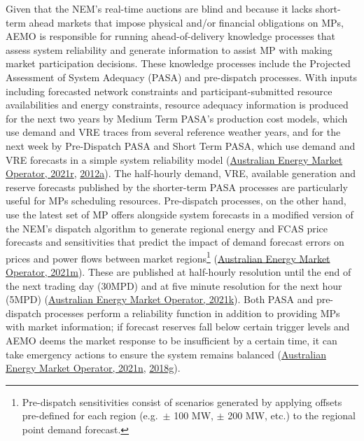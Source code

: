 \documentclass[12pt,a4paper,]{report}
\begin{document}
Given that the NEM's real-time auctions are blind and because it lacks
short-term ahead markets that impose physical and/or financial
obligations on MPs, AEMO is responsible for running ahead-of-delivery
knowledge processes that assess system reliability and generate
information to assist MP with making market participation decisions.
These knowledge processes include the Projected Assessment of System
Adequacy (PASA) and pre-dispatch processes. With inputs including
forecasted network constraints and participant-submitted resource
availabilities and energy constraints, resource adequacy information is
produced for the next two years by Medium Term PASA's production cost
models, which use demand and VRE traces from several reference weather
years, and for the next week by Pre-Dispatch PASA and Short Term PASA,
which use demand and VRE forecasts in a simple system reliability model
(\protect\hyperlink{ref-australianenergymarketoperatorMediumTermPASA2021}{Australian
Energy Market Operator, 2021r},
\protect\hyperlink{ref-australianenergymarketoperatorShortTermPASA2012}{2012a}).
The half-hourly demand, VRE, available generation and reserve forecasts
published by the shorter-term PASA processes are particularly useful for
MPs scheduling resources. Pre-dispatch processes, on the other hand, use
the latest set of MP offers alongside system forecasts in a modified
version of the NEM's dispatch algorithm to generate regional energy and
FCAS price forecasts and sensitivities that predict the impact of demand
forecast errors on prices and power flows between market
regions\footnote{Pre-dispatch sensitivities consist of scenarios
  generated by applying offsets pre-defined for each region
  (e.g.~\(\pm\) 100 MW, \(\pm\) 200 MW, etc.) to the regional point
  demand forecast.}
(\protect\hyperlink{ref-australianenergymarketoperatorPreDispatchSensitivities2021}{Australian
Energy Market Operator, 2021m}). These are published at half-hourly
resolution until the end of the next trading day (30MPD) and at five
minute resolution for the next hour (5MPD)
(\protect\hyperlink{ref-australianenergymarketoperatorPredispatchOperatingProcedure2021}{Australian
Energy Market Operator, 2021k}). Both PASA and pre-dispatch processes
perform a reliability function in addition to providing MPs with market
information; if forecast reserves fall below certain trigger levels and
AEMO deems the market response to be insufficient by a certain time, it
can take emergency actions to ensure the system remains balanced
(\protect\hyperlink{ref-australianenergymarketoperatorShortTermReserve2021}{Australian
Energy Market Operator, 2021n},
\protect\hyperlink{ref-australianenergymarketoperatorReserveLevelDeclaration2018}{2018g}).
\end{document}
